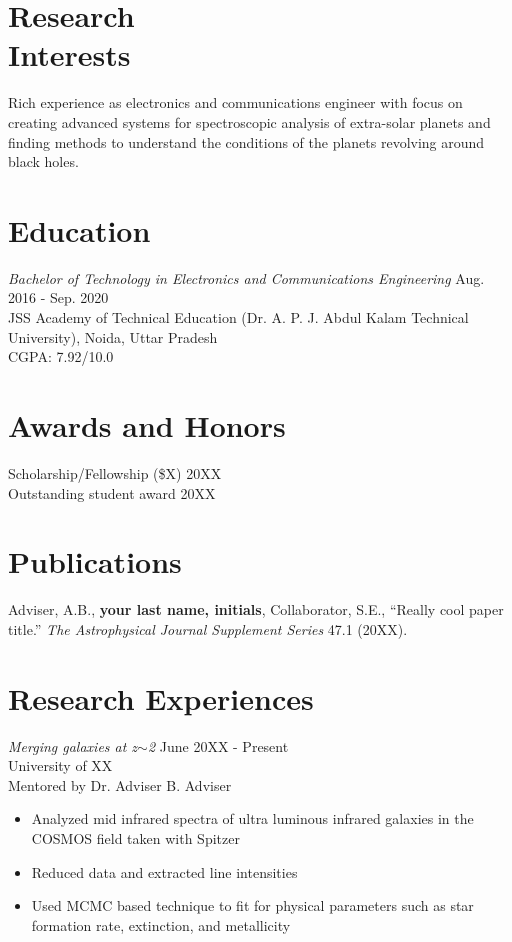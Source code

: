 \documentclass[resmargin, 10pt]{res} %
\begin{document}
\begin{resume}

\section{Research \\Interests}

Rich experience as electronics and communications engineer with focus on creating advanced systems for spectroscopic analysis of extra-solar planets and finding methods to understand the conditions of the planets revolving around black holes.

\section{Education}

{\sl Bachelor of Technology in Electronics and Communications Engineering}  \hfill Aug. 2016 - Sep. 2020 \\
JSS Academy of Technical Education (Dr. A. P. J. Abdul Kalam Technical University), Noida, Uttar Pradesh\\
\tabto{4em}CGPA: 7.92/10.0

\section{Awards and Honors}

Scholarship/Fellowship (\$X)   \hfill 20XX\\
Outstanding student award \hfill 20XX\\
 
\section{Publications} 

\hangindent=0.7cm Adviser, A.B., \textbf{your last name, initials}, Collaborator, S.E., ``Really cool paper title.'' \emph{The Astrophysical Journal Supplement Series} 47.1 (20XX). 


\section{Research Experiences}

{\sl Merging galaxies at z$\sim$2} \hfill June 20XX - Present \\
University of XX \\
Mentored by Dr. Adviser B. Adviser
\vspace{1mm}
\begin{itemize}\itemsep -2pt
\item Analyzed mid infrared spectra of ultra luminous infrared galaxies in the COSMOS field taken with Spitzer
\item Reduced data and extracted line intensities
\item Used MCMC based technique to fit for physical parameters such as star formation rate, extinction, and metallicity 
\end{itemize} 


\end{resume}
\end{document}
